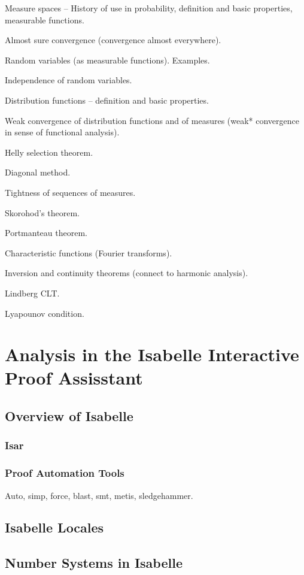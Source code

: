\documentclass{amsart}
\theoremstyle{definition}
\theoremstyle{remark}
\begin{document}
Measure spaces -- History of use in probability, definition and basic properties, measurable functions.

Almost sure convergence (convergence almost everywhere).

Random variables (as measurable functions). Examples.

Independence of random variables.

Distribution functions -- definition and basic properties.

Weak convergence of distribution functions and of measures (weak* convergence in sense of functional analysis).

Helly selection theorem.

Diagonal method.

Tightness of sequences of measures.

Skorohod's theorem.

Portmanteau theorem.

Characteristic functions (Fourier transforms).

Inversion and continuity theorems (connect to harmonic analysis).

Lindberg CLT.

Lyapounov condition.

\section{Analysis in the Isabelle Interactive Proof Assisstant}

\subsection{Overview of Isabelle}

\subsubsection{Isar}

\subsubsection{Proof Automation Tools}

Auto, simp, force, blast, smt, metis, sledgehammer.

\subsection{Isabelle Locales}

\subsection{Number Systems in Isabelle}
\end{document}

